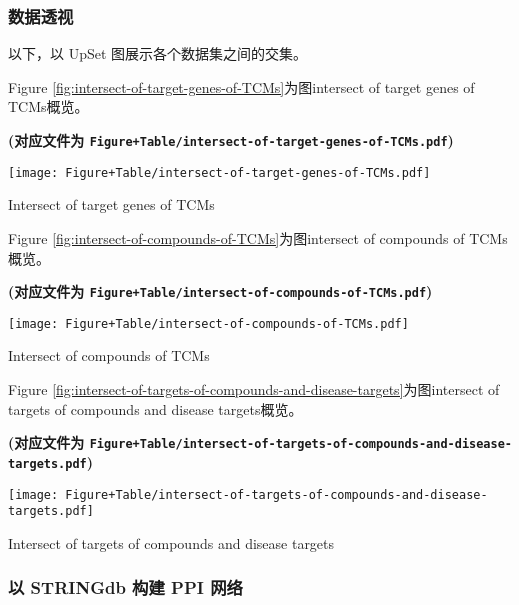 \documentclass[
]{article}
\begin{document}
\hypertarget{ux6570ux636eux900fux89c6}{%
\subsubsection{数据透视}\label{ux6570ux636eux900fux89c6}}

以下，以 UpSet 图展示各个数据集之间的交集。

Figure \ref{fig:intersect-of-target-genes-of-TCMs}为图intersect of target genes of TCMs概览。

\textbf{(对应文件为 \texttt{Figure+Table/intersect-of-target-genes-of-TCMs.pdf})}

\def\@captype{figure}
\begin{center}
\texttt{[image: Figure+Table/intersect-of-target-genes-of-TCMs.pdf]}
\caption{Intersect of target genes of TCMs}\label{fig:intersect-of-target-genes-of-TCMs}
\end{center}

Figure \ref{fig:intersect-of-compounds-of-TCMs}为图intersect of compounds of TCMs概览。

\textbf{(对应文件为 \texttt{Figure+Table/intersect-of-compounds-of-TCMs.pdf})}

\def\@captype{figure}
\begin{center}
\texttt{[image: Figure+Table/intersect-of-compounds-of-TCMs.pdf]}
\caption{Intersect of compounds of TCMs}\label{fig:intersect-of-compounds-of-TCMs}
\end{center}

Figure \ref{fig:intersect-of-targets-of-compounds-and-disease-targets}为图intersect of targets of compounds and disease targets概览。

\textbf{(对应文件为 \texttt{Figure+Table/intersect-of-targets-of-compounds-and-disease-targets.pdf})}

\def\@captype{figure}
\begin{center}
\texttt{[image: Figure+Table/intersect-of-targets-of-compounds-and-disease-targets.pdf]}
\caption{Intersect of targets of compounds and disease targets}\label{fig:intersect-of-targets-of-compounds-and-disease-targets}
\end{center}

\hypertarget{ux4ee5-stringdb-ux6784ux5efa-ppi-ux7f51ux7edc}{%
\subsubsection{以 STRINGdb 构建 PPI 网络}\label{ux4ee5-stringdb-ux6784ux5efa-ppi-ux7f51ux7edc}}
\end{document}
